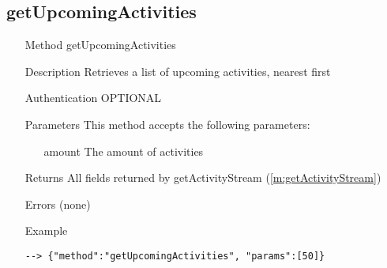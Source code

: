 \documentclass[a4paper]{scrreprt}
\begin{document}
\clearpage
\subsection{getUpcomingActivities}
\begin{enumerate}
\item[Method] getUpcomingActivities
\item[Description] Retrieves a list of upcoming activities, nearest first
\item[Authentication] OPTIONAL
\item[Parameters] This method accepts the following parameters:
\begin{enumerate}
	\item[amount] The amount of activities
    \end{enumerate}
\item[Returns] All fields returned by getActivityStream (\ref{m:getActivityStream})
\item[Errors] (none)
\item[Example]
\begin{lstlisting}
--> {"method":"getUpcomingActivities", "params":[50]}
\end{lstlisting}
\end{enumerate}

\clearpage
\end{document}
